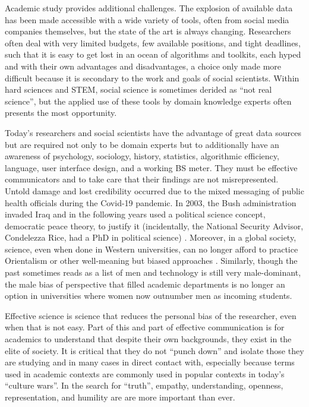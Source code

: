 \documentclass[doublespacing]{utdthesis}
\let\cite=\citep
\begin{document}
Academic study provides additional challenges.
The explosion of available data has been made accessible with a wide variety of tools, often from social media companies themselves, but the state of the art is always changing.
Researchers often deal with very limited budgets, few available positions, and tight deadlines, such that it is easy to get lost in an ocean of algorithms and toolkits, each hyped and with their own advantages and disadvantages, a choice only made more difficult because it is secondary to the work and goals of social scientists.
Within hard sciences and STEM, social science is sometimes derided as ``not real science'', but the applied use of these tools by domain knowledge experts often presents the most opportunity.

Today's researchers and social scientists have the advantage of great data sources but are required not only to be domain experts but to additionally have an awareness of psychology, sociology, history, statistics, algorithmic efficiency, language, user interface design, and a working BS meter.
They must be effective communicators and to take care that their findings are not misrepresented.
Untold damage and lost credibility occurred due to the mixed messaging of public health officials during the Covid-19 pandemic.
In 2003, the Bush administration invaded Iraq and in the following years used a political science concept, democratic peace theory, to justify it (incidentally, the National Security Advisor, Condelezza Rice, had a PhD in political science) \cite{russett2005}.
Moreover, in a global society, science, even when done in Western universities, can no longer afford to practice Orientalism or other well-meaning but biased approaches \cite{said1979orientalism}.
Similarly, though the past sometimes reads as a list of men and technology is still very male-dominant, the male bias of perspective that filled academic departments is no longer an option in universities where women now outnumber men as incoming students.

Effective science is science that reduces the personal bias of the researcher, even when that is not easy.
Part of this and part of effective communication is for academics to understand that despite their own backgrounds, they exist in the elite of society.
It is critical that they do not ``punch down'' and isolate those they are studying and in many cases in direct contact with, especially because terms used in academic contexts are commonly used in popular contexts in today's ``culture wars''.
In the search for ``truth'', empathy, understanding, openness, representation, and humility are are more important than ever.
\end{document}
